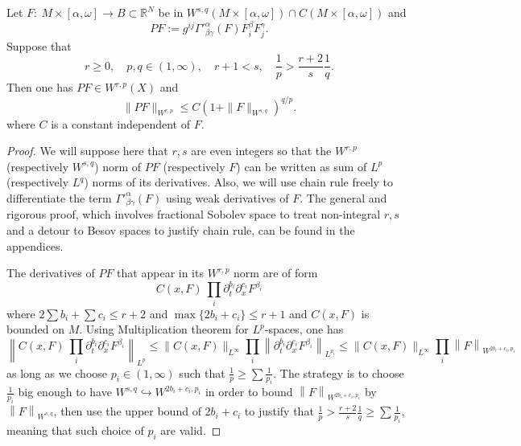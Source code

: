 \begin{theorem}
\label{thm:reg-quad}
Let \(F:\ M\times [\alpha,\omega] \longrightarrow B\subset \mathbb{R}^N\) be in \(W^{s,q}(M\times[\alpha,\omega])\cap C(M\times [\alpha,\omega])\) and
\[ 
P F := g^{ij}\Gamma'^\alpha_{\beta\gamma}(F) F^\beta_i
F^\gamma_j.
\]
Suppose that
\begin{equation}
\label{eq:cond:thm:reg-poly-diff}
 r\geq 0,\quad p,q\in (1,\infty),\quad r+1 < s, \quad \frac{1}{p}> \frac{r+2}{s} \frac{1}{q}.
\end{equation}
Then one has \(PF\in W^{r,p}(X)\) and
\[
 \|P F \|_{W^{r,p}} \leq C\left(1 + \|F\|_{W^{s,q}}\right)^{q/p}.
\]
where \(C\) is a constant independent of \(F\).
\end{theorem}

\begin{proof}
We will suppose here that \(r,s\) are even integers so that the \(W^{r,p}\)
(respectively \(W^{s,q}\)) norm of \(PF\) (respectively \(F\)) can be written as sum of \(L^p\)
(respectively \(L^q\)) norms of its derivatives. Also, we will use chain rule freely to
differentiate the term \(\Gamma'^\alpha_{\beta\gamma}(F)\) using weak derivatives of \(F\). The general and rigorous proof, which involves fractional Sobolev space to treat non-integral
\(r, s\) and a detour to Besov spaces to justify chain rule, can be found in the appendices.

The derivatives of \(PF\) that appear in its \(W^{r,p}\) norm are of form
\[
 C(x,F)\ \prod_i \partial_t^{b_i} \partial_x^{c_i} F^{\beta_i} 
\]
where \(2\sum b_i + \sum c_i \leq r+2\) and \(\max \{2b_i+ c_i\}\leq r+1\) and \(C(x,F)\) is bounded on \(M\). Using Multiplication theorem for \(L^p\)-spaces, one has
\[
  \left\|C(x,F)\ \prod_i \partial_t^{b_i} \partial_x^{c_i} F^{\beta_i} \right\|_{L^p} \leq
\|C(x,F)\|_{L^\infty} \prod_i \left\|\partial_t^{b_i} \partial_x^{c_i}
F^{\beta_i}\right\|_{L^{p_i}}  \leq \|C(x,F)\|_{L^\infty} \prod_i \left\|F\right\|_{W^{2b_i+c_i,p_i}}
\]
as long as we choose \(p_i\in (1,\infty)\) such that \(\frac{1}{p} \geq \sum
\frac{1}{p_i}\). The
strategy is to choose \(\frac{1}{p_i}\) big enough to have \(W^{s,q}
\hookrightarrow W^{2b_i+c_i,p_i}\) in order to
bound \(\left\|F\right\|_{W^{2b_i+c_i,p_i}}\) by \(\left\|F\right\|_{W^{s,q}}\), then
use the upper bound of \(2b_i +c_i\) to justify that \(\frac{1}{p} > \frac{r+2}{s}
\frac{1}{q} \geq \sum \frac{1}{p_i}\), meaning that such choice of \(p_i\) are valid.


\end{proof}
